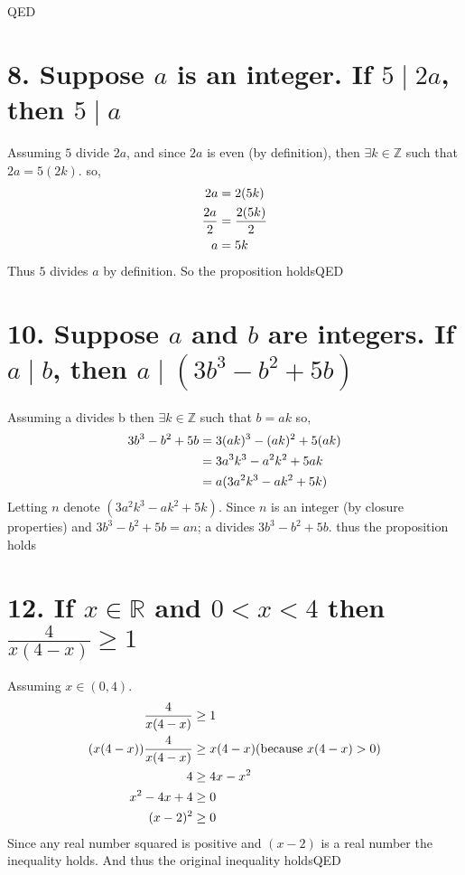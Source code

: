 \documentclass{article}
\begin{document}
\hfill QED

\section*{8. Suppose $a$ is an integer. If $5 \mid 2a$, then  $5 \mid a $}
Assuming $5$ divide $2a$, and since $2a$ is even (by definition), then $\exists k \in \mathbb{Z}$ such that $2a = 5(2k)$.
so,  
\begin{equation}\notag
	\begin{aligned}
		2a &= 2(5k)\\
		\frac{2a}{2} &= \frac{2(5k)}{2}\\
				a	 &= 5k   
	\end{aligned}
\end{equation}
Thus $5$ divides $a$ by definition. So the proposition holds\hfill QED

\section*{10. Suppose $a$ and $b$ are integers. If $a \mid b$, then $a \mid (3b^3-b^2+5b)$}
Assuming a divides b then $\exists k \in \mathbb{Z} $ such that $b=ak$
so,  
\begin{equation}\notag
	\begin{aligned}
		 3b^3-b^2+5b &= 3(ak)^3-(ak)^2+5(ak)\\
		 			 &= 3a^3k^3-a^2k^2+5ak\\
		 			 &= a(3a^2k^3-ak^2+5k)
	\end{aligned}
\end{equation}
Letting $n$ denote $(3a^2k^3-ak^2+5k)$. Since $n$ is an integer (by closure properties) and  $3b^3-b^2+5b = an$; a divides $3b^3-b^2+5b$. thus the proposition holds

\section*{12. If $x \in \mathbb{R}$ and $0 < x < 4$ then $\frac{4}{x(4-x)} \ge 1 $ }
Assuming $x \in (0,4)$. 
\begin{equation}\notag
	\begin{aligned}
		\frac{4}{x(4-x)} &\ge 1\\
		(x(4-x)) \frac{4}{x(4-x)} &\ge x(4-x) \text{(because $x(4-x)>0$)}\\
		4 &\ge 4x-x^2 \\
		x^2-4x +4 &\ge 0 \\
		(x-2)^2 &\ge 0 \\
	\end{aligned}
\end{equation}
Since any real number squared is positive and $(x-2)$ is a real number the inequality holds. And thus the original inequality holds\hfill QED
\end{document}

